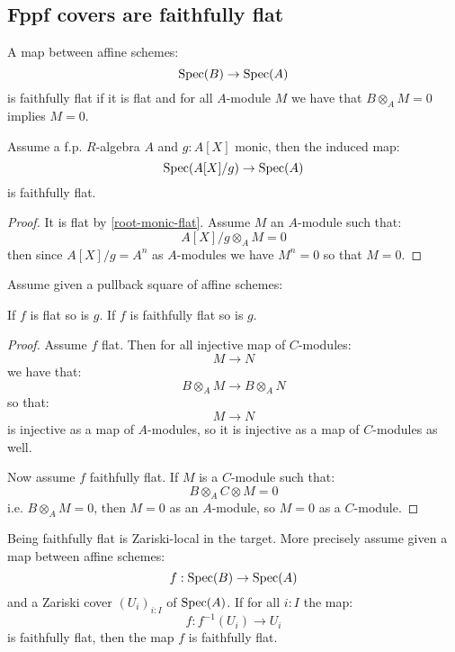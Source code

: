 \subsection{Fppf covers are faithfully flat}

\begin{definition}
A map between affine schemes:
\[\operatorname{Spec}(B)\to \operatorname{Spec}(A)\]
is faithfully flat if it is flat and for all $A$-module $M$ we have that $B\otimes_AM = 0$ implies $M=0$.
\end{definition}

\begin{lemma}\label{root-monic-faithfully-flat}
Assume a f.p. $R$-algebra $A$ and $g:A[X]$ monic, then the induced map:
\[\operatorname{Spec}(A[X]/g)\to \operatorname{Spec}(A)\]
is faithfully flat.
\end{lemma}

\begin{proof}
It is flat by \cref{root-monic-flat}. Assume $M$ an $A$-module such that:
\[ A[X]/g\otimes_AM = 0\]
then since $A[X]/g = A^n$ as $A$-modules we have $M^n = 0$ so that $M=0$.
\end{proof}

\begin{lemma}\label{pullback-faitfully-flat}
Assume given a pullback square of affine schemes:
 \begin{center}
    \end{center}
If $f$ is flat so is $g$. If $f$ is faithfully flat so is $g$.
\end{lemma}

\begin{proof}
Assume $f$ flat. Then for all injective map of $C$-modules:
\[M\to N\]
we have that:
\[B\otimes_A M \to B\otimes_A N\]
so that:
\[M\to N\]
is injective as a map of $A$-modules, so it is injective as a map of $C$-modules as well.

Now assume $f$ faithfully flat. If $M$ is a $C$-module such that:
\[B\otimes_A C\otimes M = 0\]
i.e. $B\otimes_A M = 0$, then $M=0$ as an $A$-module, so $M=0$ as a $C$-module.
\end{proof}

\begin{lemma}\label{faithfully-flat-zariski-local}
Being faithfully flat is Zariski-local in the target. More precisely assume given a map between affine schemes:
\[f:\operatorname{Spec}(B)\to \operatorname{Spec}(A)\]
and a Zariski cover $(U_i)_{i:I}$ of $\operatorname{Spec}(A)$. If for all $i:I$ the map:
\[f : f^{-1}(U_i)\to U_i\]
is faithfully flat, then the map $f$ is faithfully flat.
\end{lemma}

